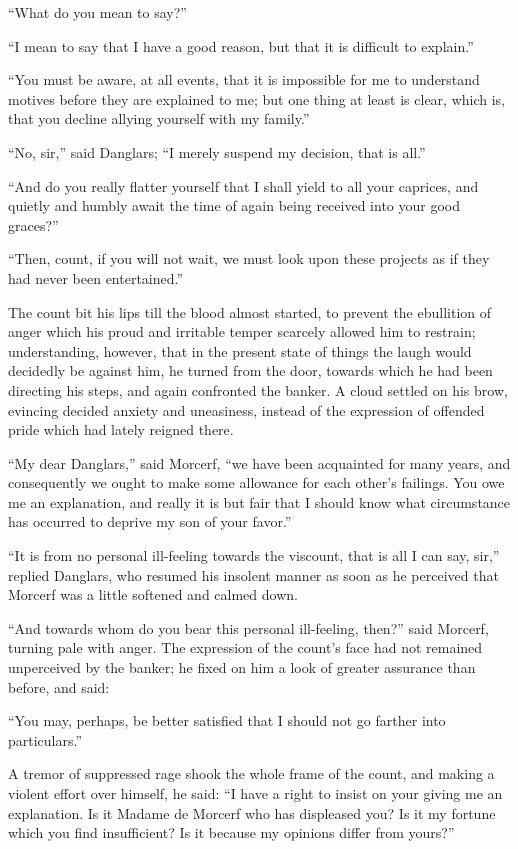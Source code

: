 “What do you mean to say?”

“I mean to say that I have a good reason, but that it is difficult to
explain.”

“You must be aware, at all events, that it is impossible for me to
understand motives before they are explained to me; but one thing at
least is clear, which is, that you decline allying yourself with my
family.”

“No, sir,” said Danglars; “I merely suspend my decision, that is all.”

“And do you really flatter yourself that I shall yield to all your
caprices, and quietly and humbly await the time of again being received
into your good graces?”

“Then, count, if you will not wait, we must look upon these projects as
if they had never been entertained.”

The count bit his lips till the blood almost started, to prevent the
ebullition of anger which his proud and irritable temper scarcely
allowed him to restrain; understanding, however, that in the present
state of things the laugh would decidedly be against him, he turned
from the door, towards which he had been directing his steps, and again
confronted the banker. A cloud settled on his brow, evincing decided
anxiety and uneasiness, instead of the expression of offended pride
which had lately reigned there.

“My dear Danglars,” said Morcerf, “we have been acquainted for many
years, and consequently we ought to make some allowance for each
other’s failings. You owe me an explanation, and really it is but fair
that I should know what circumstance has occurred to deprive my son of
your favor.”

“It is from no personal ill-feeling towards the viscount, that is all I
can say, sir,” replied Danglars, who resumed his insolent manner as
soon as he perceived that Morcerf was a little softened and calmed
down.

“And towards whom do you bear this personal ill-feeling, then?” said
Morcerf, turning pale with anger. The expression of the count’s face
had not remained unperceived by the banker; he fixed on him a look of
greater assurance than before, and said:

“You may, perhaps, be better satisfied that I should not go farther
into particulars.”

A tremor of suppressed rage shook the whole frame of the count, and
making a violent effort over himself, he said: “I have a right to
insist on your giving me an explanation. Is it Madame de Morcerf who
has displeased you? Is it my fortune which you find insufficient? Is it
because my opinions differ from yours?”

